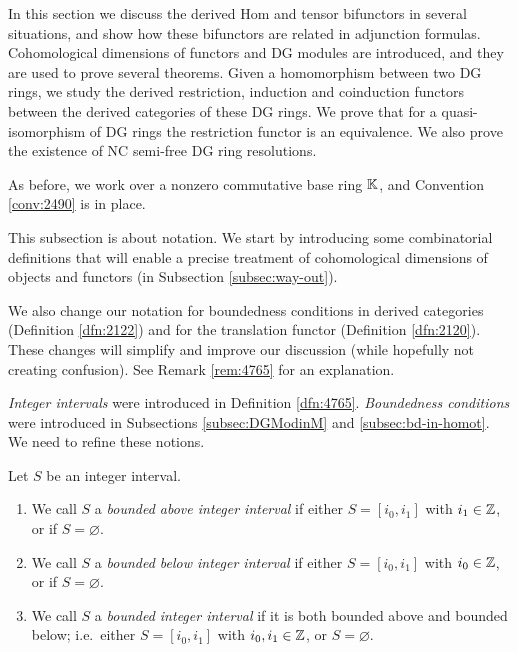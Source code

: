 \AYcopyright

In this section we discuss the derived Hom and tensor bifunctors in several 
situations, and show how these bifunctors are related in adjunction 
formulas. Cohomological dimensions of functors and DG modules are introduced, 
and they are used to prove several theorems. 
Given a homomorphism between two DG rings, we study the derived restriction, 
induction and coinduction functors between the derived categories of these DG 
rings. We prove that for a quasi-isomorphism of DG rings the restriction 
functor is an equivalence. We also prove the existence of NC semi-free DG ring 
resolutions. 

As before, we work over a nonzero commutative base ring $\mathbb{K}$, and Convention 
\ref{conv:2490} is in place. 



\label{subsec:bounded-revis}

This subsection is about notation. We start by introducing some combinatorial 
definitions that will enable a precise treatment of cohomological dimensions of 
objects and functors (in Subsection \ref{subsec:way-out}). 

We also change our notation for boundedness conditions in derived 
categories (Definition \ref{dfn:2122}) and for the translation functor 
(Definition \ref{dfn:2120}). These changes will simplify and improve our 
discussion (while hopefully not creating confusion). See Remark \ref{rem:4765} 
for an explanation. 

{\em Integer intervals} were introduced in Definition \ref{dfn:4765}. 
{\em Boundedness conditions} were introduced in Subsections 
\ref{subsec:DGModinM} and  \ref{subsec:bd-in-homot}.
We need to refine these notions. 

\begin{dfn} \label{dfn:4780}
Let $S$ be an integer interval.
\begin{enumerate}
\item We call $S$ a {\em bounded above integer interval} if either 
$S = [i_0, i_1]$ with $i_1 \in \mathbb{Z}$, or if $S = \varnothing$. 

\item We call $S$ a {\em bounded below integer interval} if either 
$S = [i_0, i_1]$ with $i_0 \in \mathbb{Z}$, or if $S = \varnothing$.

\item We call $S$ a {\em bounded integer interval} if it is both bounded above 
and bounded below; i.e.\ either $S = [i_0, i_1]$ with $i_0, i_1 \in \mathbb{Z}$, or 
$S = \varnothing$.
\end{enumerate}
\end{dfn}

